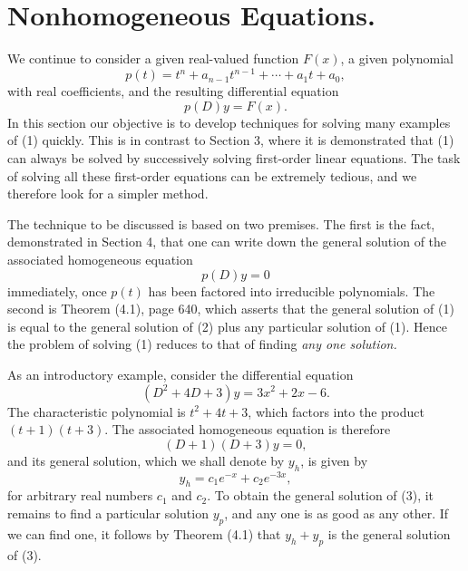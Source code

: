 \section{Nonhomogeneous Equations.} We continue to consider a given real-valued function $F(x)$, a given polynomial 
$$
p(t) = t^n + a_{n-1}t^{n-1} + \cdots + a_1t + a_0, 
$$
with real coefficients, and the resulting differential equation
\begin{equation}
p(D)y = F(x) .  
\label{eq11.5.1}
\end{equation}
In this section our objective is to develop techniques for solving many examples of (1) quickly.  This is in contrast to Section 3, where it is demonstrated that (1) can always be solved by successively solving first-order linear equations. The task of solving all these first-order equations can be extremely tedious, and we therefore look for a simpler method.

The technique to be discussed is based on two premises. The first is the fact, demonstrated in Section 4, that one can write down the general solution of the associated homogeneous equation
\begin{equation}
p(D)y = 0  
\label{eq11.5.2}
\end{equation}
immediately, once $p(t)$ has been factored into irreducible polynomials. The second is Theorem (4.1), page 640, which asserts that the general solution of (1) is equal to the general solution of (2) plus any particular solution of (1).
Hence the problem of solving (1) reduces to that of finding \textit{any one solution.}

As an introductory example, consider the differential equation 
\begin{equation}
(D^2 + 4D + 3)y = 3x^2 + 2x - 6. 
\label{eq11.5.3}
\end{equation}
The characteristic polynomial is $t^2 + 4t + 3$, which factors into the product $(t + 1)(t + 3)$. The associated homogeneous equation is therefore
$$
(D + 1)(D + 3)y = 0, 
$$
and its general solution, which we shall denote by $y_h$, is given by
$$
y_h = c_1e^{-x} + c_2e^{-3x},
$$
for arbitrary real numbers $c_1$ and $c_2$. To obtain the general solution of (3), it remains to find a particular solution $y_p$, and any one is as good as any other. If we can find one, it follows by Theorem (4.1) that $y_h + y_p$ is the general solution of (3).

